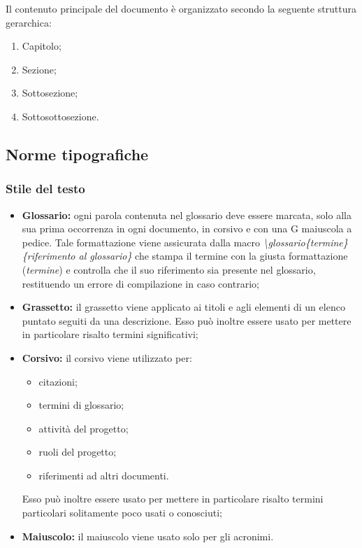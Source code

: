 \documentclass[../NormediProgetto.tex]{subfiles}
\begin{document}
Il contenuto principale del documento è organizzato secondo la seguente struttura gerarchica:

\begin{enumerate}
    \item Capitolo;
    \item Sezione;
    \item Sottosezione;
    \item Sottosottosezione.
\end{enumerate}


\subsection{Norme tipografiche}

\subsubsection{Stile del testo}

\begin{itemize}
    
    \item \textbf{Glossario:} ogni parola contenuta nel glossario deve essere marcata, solo alla sua prima occorrenza in ogni documento, in corsivo e con una G maiuscola a pedice. Tale formattazione viene assicurata dalla macro \textit{\textbackslash glossario\{termine\}\{riferimento al glossario\}} che stampa il termine con la giusta formattazione (\textit{termine}) e controlla che il suo riferimento sia presente nel glossario, restituendo un errore di compilazione in caso contrario;  
    
    \item \textbf{Grassetto:} il grassetto viene applicato ai titoli e agli elementi di un elenco puntato seguiti da una descrizione. Esso può inoltre essere usato per mettere in particolare risalto termini significativi; 
    
    \item \textbf{Corsivo:} il corsivo viene utilizzato per:
    \begin{itemize}
        \item citazioni;
        \item termini di glossario;
        \item attività del progetto;
        \item ruoli del progetto;
        \item riferimenti ad altri documenti.
    \end{itemize}
    
     Esso può inoltre essere usato per mettere in particolare risalto termini particolari solitamente poco usati o conosciuti;
    
    \item{\textbf{Maiuscolo:}} il maiuscolo viene usato solo per gli acronimi.

\end{itemize}
\end{document}
